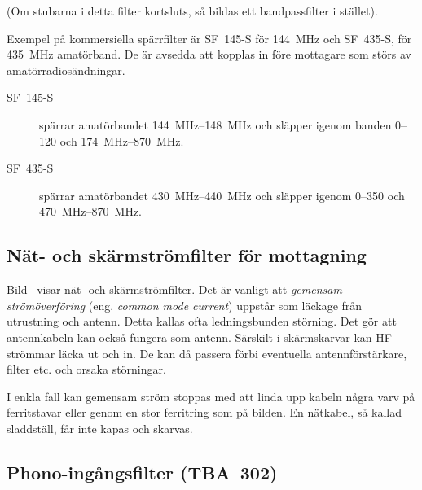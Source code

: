 (Om stubarna i detta filter kortsluts, så bildas ett bandpassfilter i stället).

Exempel på kommersiella spärrfilter är SF~145-S för \qty{144}{\mega\hertz} och
SF~435-S, för \qty{435}{\mega\hertz} amatörband.
De är avsedda att kopplas in före mottagare som störs av amatörradiosändningar.

\begin{description}
\item[SF~145-S] spärrar amatörbandet \SIrange{144}{148}{\mega\hertz} och släpper
igenom banden 0--120 och \SIrange{174}{870}{\mega\hertz}.

\item[SF~435-S] spärrar amatörbandet \SIrange{430}{440}{\mega\hertz} och släpper
igenom 0--350 och \SIrange{470}{870}{\mega\hertz}.
\end{description}

\subsection{Nät- och skärmströmfilter för mottagning}


Bild~ visar nät- och skärmströmfilter.
Det är vanligt att \emph{gemensam strömöverföring} (eng.
\emph{common mode current}) uppstår som läckage från utrustning och antenn.
Detta kallas ofta ledningsbunden störning.
Det gör att antennkabeln kan också fungera som antenn.
Särskilt i skärmskarvar kan HF-strömmar läcka ut och in.
De kan då passera förbi eventuella antennförstärkare, filter etc. och orsaka
störningar.

I enkla fall kan gemensam ström stoppas med att linda upp kabeln några varv på
ferritstavar eller genom en stor ferritring som på bilden.
En nätkabel, så kallad sladdställ, får inte kapas och skarvas.


\subsection{Phono-ingångsfilter (TBA~302)}



